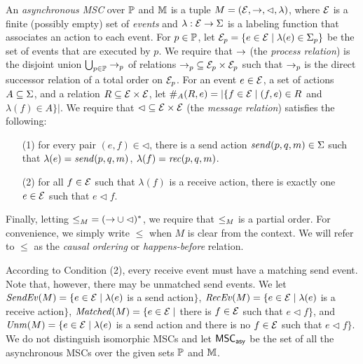 \documentclass{article}
\begin{document}
\begin{definition}
An \emph{asynchronous MSC} over $\Procs$ and $\Msg$ is a tuple $\msc = (\Events,\procrel,\lhd,\lambda)$, where $\Events$ is a finite (possibly empty) set of \emph{events} and $\lambda: \Events \to \Act$ is a labeling function that associates an action to each event. For $p \in \Procs$, let $\Events_p = \{e \in \Events \mid \lambda(e) \in \pAct{p}\}$ be the set of events that are executed by $p$. We require that $\procrel$ (the \emph{process relation}) is the disjoint union $\bigcup_{p \in \Procs} \procrel_p$ of relations ${\procrel_p} \subseteq \Events_p \times \Events_p$ such that $\procrel_p$ is the direct successor relation of a total order on $\Events_p$. For an event $e \in \Events$, a set of actions $A \subseteq \Act$, and a relation $\rel \subseteq \Events \times \Events$,
let $\sametype{e}{A}{\rel} = |\{f \in \Events \mid (f,e) \in \rel$ and $\lambda(f) \in A\}|$. We require that ${\lhd} \subseteq \Events \times \Events$ (the \emph{message relation}) satisfies the following:
\begin{itemize}\itemsep=0.5ex
\item[(1)] for every pair $(e,f) \in {\lhd}$, there is a send action $\sact{p}{q}{\msg} \in \Act$ such that $\lambda(e) = \sact{p}{q}{\msg}$, $\lambda(f) = \ract{p}{q}{\msg}$.
\item[(2)] for all $f \in \Events$ such that $\lambda(f)$ is a receive action, there is exactly one $e \in \Events$ such that $e \lhd f$.
\end{itemize}
Finally, letting ${\le}_\msc = ({\procrel} \cup {\lhd})^\ast$,
we require that $\le_\msc$ is a partial order. For convenience, we simply write $\le$ when $M$ is clear from the context. We will refer to $\le$ as the \emph{causal ordering} or \emph{happens-before} relation.
\end{definition}

According to Condition (2), every receive event must have a matching send event. Note that, however, there may be unmatched send events.
We let
$\SendEv{\msc} = \{e \in \Events \mid \lambda(e)$ is a send
action$\}$,
$\RecEv{\msc} = \{e \in \Events \mid \lambda(e)$ is a receive
action$\}$,
$\Matched{\msc} = \{e \in \Events \mid$ there is $f \in \Events$
such that $e \lhd f\}$, and
$\Unm{\msc} = \{e \in \Events \mid \lambda(e)$ is a send
action and there is no $f \in \Events$ such that $e \lhd f\}$.
%
We do not distinguish isomorphic MSCs and
let $\asMSCs$ be the set of all the asynchronous MSCs over the given sets $\Procs$ and $\Msg$.
\end{document}
